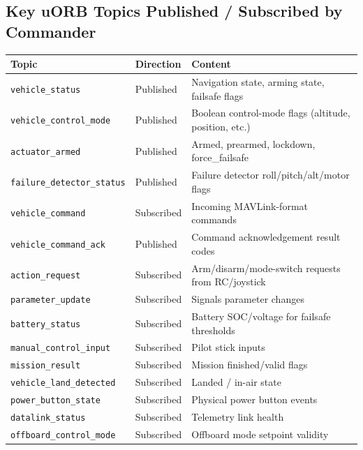 \documentclass[12pt,a4paper]{article}
\begin{document}
\subsection*{Key uORB Topics Published / Subscribed by Commander}
\begin{center}\begin{tabular}{lll}\toprule
Topic & Direction & Content \\\midrule
\texttt{vehicle\_status} & Published & Navigation state, arming state, failsafe flags \\
\texttt{vehicle\_control\_mode} & Published & Boolean control-mode flags (altitude, position, etc.) \\
\texttt{actuator\_armed} & Published & Armed, prearmed, lockdown, force\_failsafe \\
\texttt{failure\_detector\_status} & Published & Failure detector roll/pitch/alt/motor flags \\
\texttt{vehicle\_command} & Subscribed & Incoming MAVLink-format commands \\
\texttt{vehicle\_command\_ack} & Published & Command acknowledgement result codes \\
\texttt{action\_request} & Subscribed & Arm/disarm/mode-switch requests from RC/joystick \\
\texttt{parameter\_update} & Subscribed & Signals parameter changes \\
\texttt{battery\_status} & Subscribed & Battery SOC/voltage for failsafe thresholds \\
\texttt{manual\_control\_input} & Subscribed & Pilot stick inputs \\
\texttt{mission\_result} & Subscribed & Mission finished/valid flags \\
\texttt{vehicle\_land\_detected} & Subscribed & Landed / in-air state \\
\texttt{power\_button\_state} & Subscribed & Physical power button events \\
\texttt{datalink\_status} & Subscribed & Telemetry link health \\
\texttt{offboard\_control\_mode} & Subscribed & Offboard mode setpoint validity \\
\bottomrule\end{tabular}\end{center}
\end{document}
